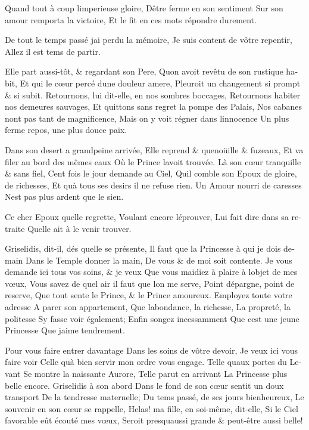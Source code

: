 \documentclass[14pt,a4paper]{memoir}
\begin{document}
{{\begin{otherlanguage}{french}
{Quand tout à coup l\textquotesingle imperieuse gloire,}
{D\textquotesingle être ferme en son sentiment} {Sur son amour remporta
la victoire,} {Et le fit en ces mots répondre durement.}

{De tout le temps passé j\textquotesingle ai perdu la mémoire,} {Je suis
content de vôtre repentir,} {Allez il est tems de partir.}

{Elle part aussi-tôt, \& regardant son Pere,} {Qu\textquotesingle on
avoit revêtu de son rustique habit,} {Et qui le cœur percé
d\textquotesingle une douleur amere, } {Pleuroit un changement si prompt
\& si subit. } {Retournons, lui dit-elle, en nos sombres boccages,}
{Retournons habiter nos demeures sauvages,} {Et quittons sans regret la
pompe des Palais,} {Nos cabanes n\textquotesingle ont pas tant de
magnificence,} {Mais on y voit régner dans l\textquotesingle innocence}
{Un plus ferme repos, une plus douce paix.}

{Dans son desert a grand\textquotesingle peine arrivée,} {Elle reprend
\& quenoüille \& fuzeaux,} {Et va filer au bord des mêmes eaux} {Où le
Prince l\textquotesingle avoit trouvée.} {Là son cœur tranquille \& sans
fiel,} {Cent fois le jour demande au Ciel,} {Qu\textquotesingle il
comble son Epoux de gloire, de richesses, } {Et qu\textquotesingle à
tous ses desirs il ne refuse rien.} {Un Amour nourri de caresses}
{N\textquotesingle est pas plus ardent que le sien.}

{Ce cher Epoux qu\textquotesingle elle regrette,} {Voulant encore
l\textquotesingle éprouver,} {Lui fait dire dans sa retraite}
{Qu\textquotesingle elle ait à le venir trouver.}

{Griselidis, dit-il, dés qu\textquotesingle elle se présente,} {Il faut
que la Princesse à qui je dois demain} {Dans le Temple donner la main,}
{De vous \& de moi soit contente.} {Je vous demande ici tous vos soins,
\& je veux } {Que vous m\textquotesingle aidiez à plaire à
l\textquotesingle objet de mes vœux,} {Vous savez de quel air il faut
que l\textquotesingle on me serve, } {Point d\textquotesingle épargne,
point de reserve,} {Que tout sente le Prince, \& le Prince amoureux.}
{Employez toute votre adresse} {A parer son appartement,} {Que
l\textquotesingle abondance, la richesse,} {La propreté, la politesse}
{S\textquotesingle y fasse voir également;} {Enfin songez incessamment}
{Que c\textquotesingle est une jeune Princesse} {Que
j\textquotesingle aime tendrement.}

{Pour vous faire entrer davantage} {Dans les soins de vôtre devoir,} {Je
veux ici vous faire voir} {Celle qu\textquotesingle à bien servir mon
ordre vous engage.} {Telle qu\textquotesingle aux portes du Levant} {Se
montre la naissante Aurore,} {Telle parut en arrivant} {La Princesse
plus belle encore.} {Griselidis à son abord} {Dans le fond de son cœur
sentit un doux transport} {De la tendresse maternelle;} {Du tems passé,
de ses jours bienheureux,} {Le souvenir en son cœur se rappelle,}
{Helas! ma fille, en soi-même, dit-elle,} {Si le Ciel favorable eût
écouté mes vœux, } {Seroit presqu\textquotesingle aussi grande \&
peut-être aussi belle!}


\end{otherlanguage}}}
\end{document}
